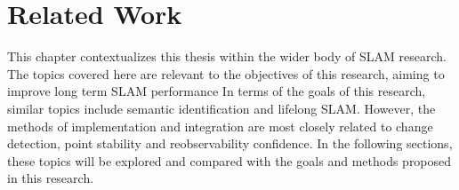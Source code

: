 \section{Related Work}
\label{sec:related_work}

This chapter contextualizes this thesis within the wider body of SLAM research. The topics covered here are relevant to the objectives of this research, aiming to improve long term SLAM performance
In terms of the goals of this research, similar topics include semantic identification and lifelong SLAM. However, the methods of implementation and integration are most closely related to change detection, point stability and reobservability confidence. In the following sections, these topics will be explored and compared with the goals and methods proposed in this research.

% 